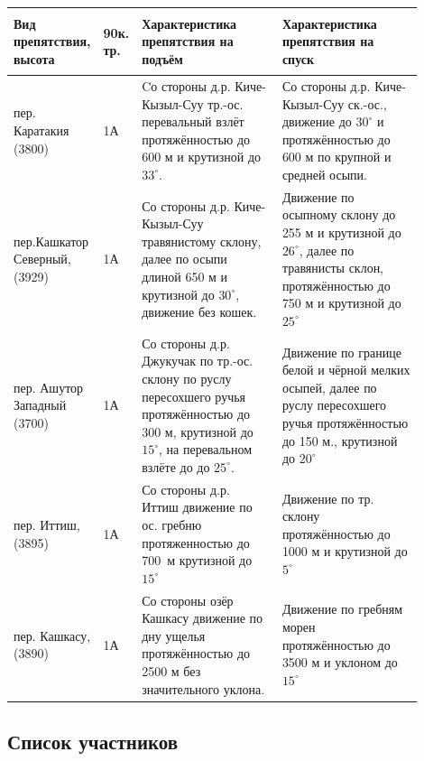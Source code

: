 \begin{table}[h!]
		\begin{tabular}{|>{\centering\arraybackslash}m{0.17\linewidth}|>{\centering\arraybackslash}m{0.03\linewidth}|>{\centering\arraybackslash}m{0.35\linewidth}|>{\centering\arraybackslash}m{0.35\linewidth}|}
			\hline
			\textbf{Вид препятствия, высота} &
			\begin{turn}{90}\textbf{к. тр.}\end{turn} &
			\textbf{Характеристика препятствия на подъём} &
			\textbf{Характеристика препятствия на спуск} \\
			\hline			
			пер. Каратакия (3800) & 1А 
			& Cо стороны д.р. Киче-Кызыл-Суу   тр.-ос. перевальный взлёт
			протяжённостью до 600 м и крутизной до $33^{\circ}$.
			& Со стороны д.р. Киче-Кызыл-Суу ск.-ос., движение до $30^{\circ}$ и
			протяжённостью до  600 м по крупной и средней осыпи.\\
			\hline			
			пер.Кашкатор Северный,(3929) & 1А 
			& Со стороны д.р. Киче-Кызыл-Суу травянистому склону, далее по осыпи длиной 650 м и крутизной до $30^{\circ}$, движение без кошек. 
			& Движение по осыпному склону до 255 м и крутизной до $26^{\circ}$, далее по травянисты склон, 
			протяжённостью до 750 м и крутизной до $25^{\circ}$ \\
			\hline
			пер. Ашутор Западный (3700)  & 1А 
			& Со стороны д.р. Джукучак по тр.-ос. склону по руслу пересохшего ручья протяжённостью до 300 м, крутизной до $15^{\circ}$, на перевальном взлёте до до $25^{\circ}$. 
			& Движение по границе белой и чёрной мелких осыпей, далее по руслу пересохшего ручья протяжённостью до 150 м., крутизной до $20^{\circ}$\\
			\hline
			пер. Иттиш, (3895)  & 1А 
			& Со стороны д.р. Иттиш движение по ос. гребню протяженностью до 700~м крутизной  до $15^{\circ}$ 
			& Движение по тр. склону протяжённостью до 1000 м и крутизной до $5^{\circ}$\\
			\hline
			пер. Кашкасу, (3890)  & 1А 
			& Со стороны озёр Кашкасу движение по дну ущелья протяжённостью до 2500 м без значительного уклона. 
			&  Движение по гребням морен протяжённостью до 3500 м и уклоном до $15^{\circ}$\\
			\hline
	\end{tabular}%
\end{table}

\clearpage
\subsection{Список участников} 

